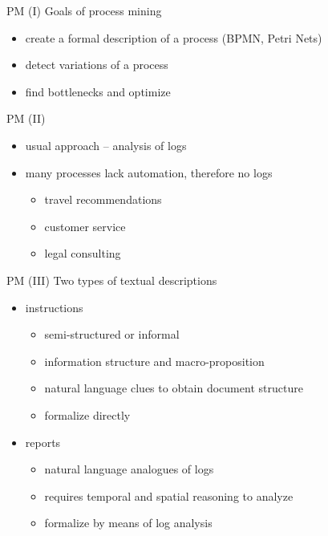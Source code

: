 \documentclass{beamer}
\begin{document}
\begin{frame}{PM (I)}
Goals of process mining\\
\bigskip
\begin{itemize}
    \item create a formal description of a process (BPMN, Petri Nets)
    \item detect variations of a process
    \item find bottlenecks and optimize
\end{itemize}
\end{frame}

\begin{frame}{PM (II)}
\begin{itemize}
    \item usual approach -- analysis of logs
    \item many processes lack automation, therefore no logs
        \begin{itemize}
            \item travel recommendations
            \item customer service
            \item legal consulting
        \end{itemize}
\end{itemize}
\end{frame}

\begin{frame}{PM (III)}
Two types of textual descriptions\\
\bigskip
\begin{itemize}
    \item instructions
        \begin{itemize}
            \item semi-structured or informal
            \item information structure and macro-proposition
            \item natural language clues to obtain document structure
            \item formalize directly
        \end{itemize}
    \item reports
        \begin{itemize}
            \item natural language analogues of logs
            \item requires temporal and spatial reasoning to analyze
            \item formalize by means of log analysis
        \end{itemize}
\end{itemize}
\end{frame}
\end{document}

